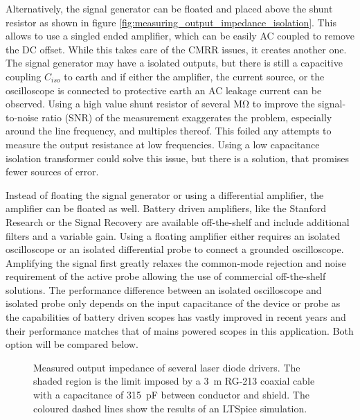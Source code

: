Alternatively, the signal generator can be floated and placed above the shunt resistor as shown in figure \ref{fig:measuring_output_impedance_isolation}. This allows to use a singled ended amplifier, which can be easily AC coupled to remove the DC offset. While this takes care of the CMRR issues, it creates another one. The signal generator may have a isolated outputs, but there is still a capacitive coupling $C_{iso}$ to earth and if either the amplifier, the current source, or the oscilloscope is connected to protective earth an AC leakage current can be observed. Using a high value shunt resistor of several \unit{\mega \ohm} to improve the signal-to-noise ratio (SNR) of the measurement exaggerates the problem, especially around the line frequency, and multiples thereof. This foiled any attempts to measure the output resistance at low frequencies. Using a low capacitance isolation transformer could solve this issue, but there is a solution, that promises fewer sources of error.

Instead of floating the signal generator or using a differential amplifier, the amplifier can be floated as well. Battery driven amplifiers, like the Stanford Research  or the Signal Recovery  are available off-the-shelf and include additional filters and a variable gain. Using a floating amplifier either requires an isolated oscilloscope or an isolated differential probe to connect a grounded oscilloscope. Amplifying the signal first greatly relaxes the common-mode rejection and noise requirement of the active probe allowing the use of commercial off-the-shelf solutions. The performance difference between an isolated oscilloscope and isolated probe only depends on the input capacitance of the device or probe as the capabilities of battery driven scopes has vastly improved in recent years and their performance matches that of mains powered scopes in this application. Both option will be compared below.
\begin{figure}[ht]
    \centering
    
    \caption{Measured output impedance of several laser diode drivers. The shaded region is the limit imposed by a \qty{3}{\m} RG-213 coaxial cable with a capacitance of \qty{315}{\pF} between conductor and shield. The coloured dashed lines show the results of an LTSpice simulation.}
    \label{fig:dgDrive_output_impedance_comparison}
\end{figure}

